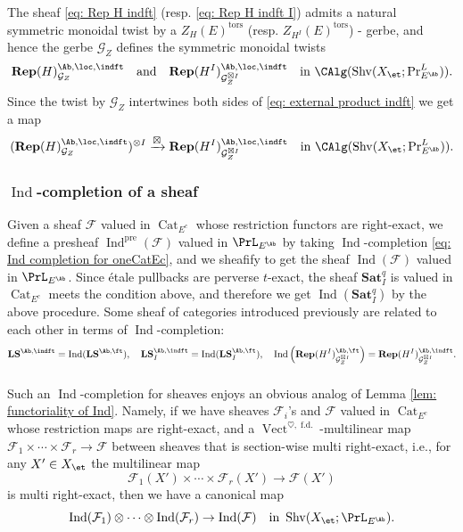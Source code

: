 \documentclass[10pt]{amsart}
\newcommand{\sssec}{\subsubsection}
\theoremstyle{remark}
\newcommand{\te}{\text}
\newcommand{\on}{\operatorname}
\newcommand{\cF}{\mathcal{F}}
\newcommand{\cG}{\mathcal{G}}
\newcommand{\Cat}{\on{Cat}}
\newcommand{\CatEc}{\Cat_{E^c}}
\newcommand{\Vect}{\on{Vect}}
\newcommand{\Shv}{\on{Shv}}
\DeclareMathOperator{\Ind}{Ind}
\begin{document}
The sheaf \eqref{eq: Rep H indft} (resp. \eqref{eq: Rep H indft I}) admits a natural symmetric monoidal twist by a $Z_H(E)^{\on{tors}}$ (resp. $Z_{H^I}(E)^{\on{tors}}$) - gerbe, and hence the gerbe $\cG_Z$ defines the symmetric monoidal twists
\[\textbf{Rep}(H)^{\Ab,\loc,\indft}_{\cG_Z}\quad\te{and}\quad \textbf{Rep}(H^I)^{\Ab,\loc,\indft}_{\cG^{\boxtimes I}_Z}\quad \te{in }\CAlg(\Shv(X_{\et};\on{Pr}^L_{E^{\Ab}})).\]
Since the twist by $\cG_Z$ intertwines both sides of \eqref{eq: external product indft} we get a map
\begin{equation}\label{eq: external product indft twisted}
    (\mathbf{Rep}(H)^{\Ab,\loc,\indft}_{\cG_Z})^{\otimes I}\xrightarrow{\boxtimes} \mathbf{Rep}(H^I)^{\Ab,\loc,\indft}_{\cG^{\boxtimes I}_Z}\quad \te{in }\CAlg(\Shv(X_{\et};\on{Pr}^L_{E^{\Ab}})).
\end{equation}


\sssec{$\Ind$-completion of a sheaf}
 Given a sheaf $\cF$ valued in $\CatEc$ whose restriction functors are right-exact, we define a presheaf $\Ind^{\on{pre}}(\cF)$ valued in $\PrL_{E^{\Ab}}$ by taking $\Ind$-completion \eqref{eq: Ind completion for oneCatEc}, and we sheafify to get the sheaf $\Ind(\cF)$ valued in $\PrL_{E^{\Ab}}$. Since \'etale pullbacks are perverse $t$-exact, the sheaf $\mathbf{Sat}^q_I$ is valued in $\CatEc$ meets the condition above, and therefore we get $\Ind(\mathbf{Sat}^q_I)$ by the above procedure. Some sheaf of categories introduced previously are related to each other in terms of $\Ind$-completion:
\[\mathbf{LS}^{\Ab,\indft}=\Ind(\mathbf{LS}^{\Ab,\ft}),\quad \mathbf{LS}^{\Ab,\indft}_I=\Ind(\mathbf{LS}^{\Ab,\ft}_I),\quad \Ind\left(\mathbf{Rep}(H^I)^{\Ab,\ft}_{\cG^{\boxtimes I}_Z}\right) =\mathbf{Rep}(H^I)^{\Ab,\indft}_{\cG^{\boxtimes I}_Z}.\]


\sssec{}\label{sssec: sheafy version of multi right exact}
Such an $\Ind$-completion for sheaves enjoys an obvious analog of Lemma \ref{lem: functoriality of Ind}. Namely, if we have sheaves $\cF_i$'s and $\cF$ valued in $\CatEc$ whose restriction maps are right-exact, and a $\Vect^{\heartsuit,\on{f.d.}}$-multilinear map $\cF_1\times\cdots\times \cF_r\rightarrow \cF$ between sheaves that is section-wise multi right-exact, i.e., for any $X'\in X_{\et}$ the multilinear map
\[\cF_1(X')\times\cdots\times \cF_r(X')\rightarrow \cF(X')\]
is multi right-exact, then we have a canonical map
\[\Ind(\cF_1)\otimes\cdots\otimes\Ind(\cF_r)\rightarrow\Ind(\cF)\quad \te{in }\Shv(X_{\et};\PrL_{E^{\Ab}}).\]
\end{document}

